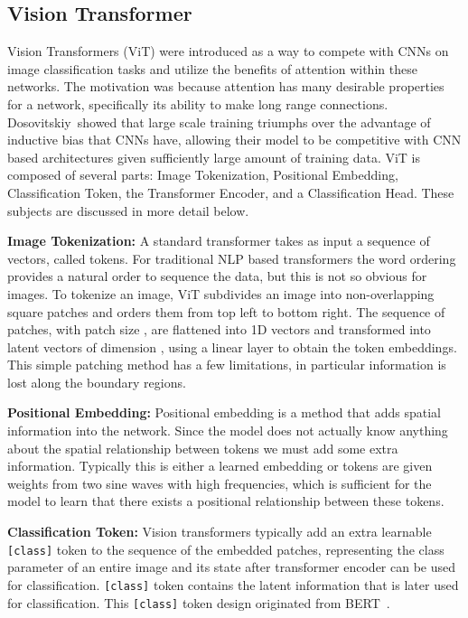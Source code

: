 \documentclass[10pt,twocolumn,letterpaper]{article}
\begin{document}
\subsection{Vision Transformer}
\label{subsec:vits}
Vision Transformers (ViT) were introduced as a way to compete with CNNs on image classification tasks and utilize the benefits of attention within these networks. 
The motivation was because attention has many desirable properties for a network, specifically its ability to make long range connections.
Dosovitskiy~\etal showed that large scale training triumphs over the advantage of inductive bias that CNNs have, allowing their model to be competitive with CNN based architectures given sufficiently large amount of training data.
ViT is composed of several parts: Image Tokenization, Positional Embedding, Classification Token, the Transformer Encoder, and a Classification Head. 
These subjects are discussed in more detail below. 

\textbf{Image Tokenization:}
A standard transformer takes as input a sequence of vectors, called tokens. 
For traditional NLP based transformers the word ordering provides a natural order to sequence the data, but this is not so obvious for images. 
To tokenize an image, ViT subdivides an image into non-overlapping square patches and orders them from top left to bottom right. 
The sequence of patches,  with patch size , are flattened into 1D vectors and transformed into latent vectors of dimension , using a linear layer to obtain the token embeddings. 
This simple patching method has a few limitations, in particular information is lost along the boundary regions. 

\textbf{Positional Embedding:}
Positional embedding is a method that adds spatial information into the network. 
Since the model does not actually know anything about the spatial relationship between tokens we must add some extra information. 
Typically this is either a learned embedding or tokens are given weights from two sine waves with high frequencies, which is sufficient for the model to learn that there exists a positional relationship between these tokens.


\textbf{Classification Token:}
Vision transformers typically add an extra learnable \verb|[class]| token to the sequence of the embedded patches, representing the class parameter of an entire image and its state after transformer encoder can be used for classification. 
\verb|[class]| token contains the latent information that is later used for classification. 
This \verb|[class]| token design originated from BERT~\cite{devlin2019bert}.
\end{document}
